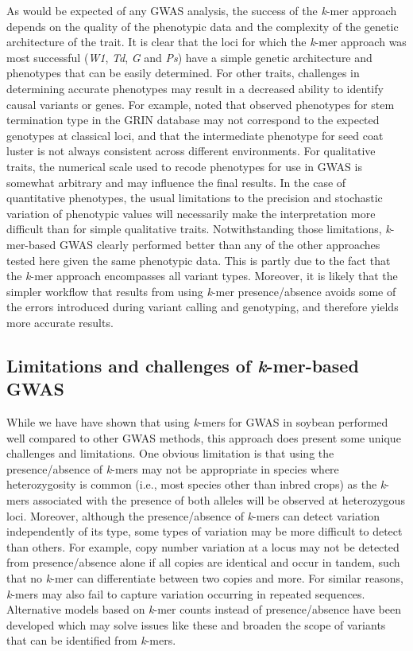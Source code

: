 As would be expected of any GWAS analysis, the success of the \emph{k}-mer approach
depends on the quality of the phenotypic data and the complexity of the genetic
architecture of the trait. It is clear that the loci for which the
\emph{k}-mer approach was most successful (\emph{W1}, \emph{Td}, \emph{G} and
\emph{Ps}) have a simple genetic architecture and phenotypes that can be easily
determined. For other traits, challenges in determining accurate phenotypes may
result in a decreased ability to identify causal variants or genes. For
example, \cite{bandillo2017} noted that observed phenotypes for stem
termination type in the GRIN database may not correspond to the expected
genotypes at classical loci, and that the intermediate phenotype for seed coat
luster is not always consistent across different environments. For qualitative
traits, the numerical scale used to recode phenotypes for use in GWAS is somewhat
arbitrary and may influence the final results. In the case of quantitative
phenotypes, the usual limitations to the precision and stochastic variation of
phenotypic values will necessarily make the interpretation more difficult than
for simple qualitative traits. Notwithstanding those limitations,
\textit{k}-mer-based GWAS clearly performed better than any of the other
approaches tested here given the same phenotypic data. This is partly due
to the fact that the \textit{k}-mer approach encompasses all variant types.
Moreover, it is likely that the simpler workflow that results from using
\textit{k}-mer presence/absence avoids some of the errors introduced during
variant calling and genotyping, and therefore yields more accurate results.

\subsection*{Limitations and challenges of \emph{k}-mer-based GWAS}
\label{limitations-of-kmers-GWAS}

While we have have shown that using \emph{k}-mers for GWAS in soybean performed
well compared to other GWAS methods, this
approach does present some unique challenges and limitations. One obvious limitation
is that using the presence/absence of \emph{k}-mers may not be appropriate in
species where heterozygosity is common (i.e., most species other than inbred
crops) as the \emph{k}-mers associated with the presence of both alleles will
be observed at heterozygous loci. Moreover, although the presence/absence of
\emph{k}-mers can detect variation independently of its type, some types of
variation may be more difficult to detect than others.
For example, copy number variation at a locus may not be
detected from presence/absence alone if all copies are identical and occur in
tandem, such that no \textit{k}-mer can differentiate between two copies and
more. For similar reasons, \emph{k}-mers may also fail to capture variation
occurring in repeated sequences. Alternative models based on \emph{k}-mer
counts instead of presence/absence have been developed \citep{rahman2018,
he2021} which may solve issues like these and broaden the scope of variants
that can be identified from \emph{k}-mers.

